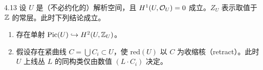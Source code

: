\begin{lemmap}{4.13}
设 $U$ 是（不必约化的）解析空间，且 $H^1(U,\mathcal{O}_U)=0$ 成立。$Z_U$ 表示取值于 $\mathbb{Z}$ 的常层。此时下列结论成立。
\begin{enumerate}[label=(\arabic*),leftmargin=*]
\item 存在单射 $\operatorname{Pic}(U)\hookrightarrow H^2(U,\mathbb{Z}_U)$。
\item 假设存在紧曲线 $C=\bigcup C_i\subset U$，使 $\mathrm{red}(U)$ 以 $C$ 为收缩核（retract）。此时 $U$ 上线丛 $L$ 的同构类仅由数值 $(L\cdot C_i)$ 决定。
\end{enumerate}
\end{lemmap}

